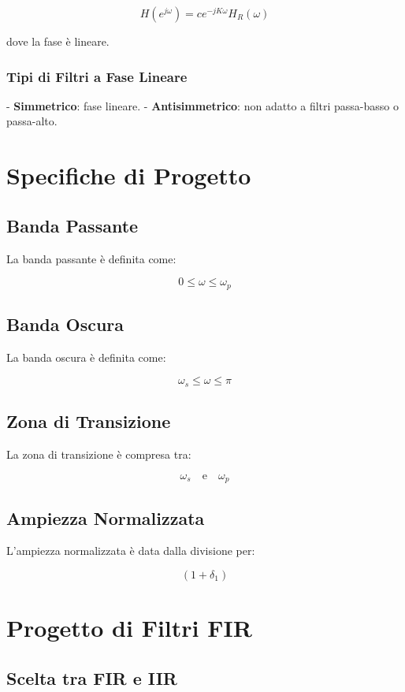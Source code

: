 \[
H(e^{j\omega}) = c e^{-jK\omega} H_R(\omega)
\]

dove la fase è lineare.

\subsubsection*{Tipi di Filtri a Fase Lineare}

- \textbf{Simmetrico}: fase lineare.
- \textbf{Antisimmetrico}: non adatto a filtri passa-basso o passa-alto.

\section{Specifiche di Progetto}

\subsection*{Banda Passante}

La banda passante è definita come:

\[
0 \leq \omega \leq \omega_p
\]

\subsection*{Banda Oscura}

La banda oscura è definita come:

\[
\omega_s \leq \omega \leq \pi
\]

\subsection*{Zona di Transizione}

La zona di transizione è compresa tra:

\[
\omega_s \quad \text{e} \quad \omega_p
\]

\subsection*{Ampiezza Normalizzata}

L'ampiezza normalizzata è data dalla divisione per:

\[
(1 + \delta_1)
\]

\section{Progetto di Filtri FIR}

\subsection*{Scelta tra FIR e IIR}

